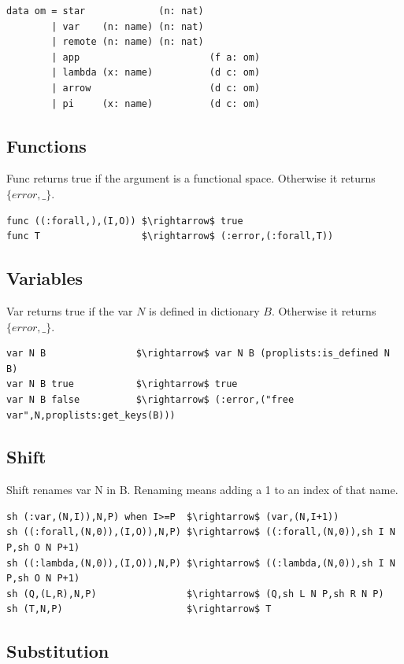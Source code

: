 \documentclass{aip-cp}
\begin{document}
\begin{lstlisting}[mathescape=true]
data om = star             (n: nat)
        | var    (n: name) (n: nat)
        | remote (n: name) (n: nat)
        | app                       (f a: om)
        | lambda (x: name)          (d c: om)
        | arrow                     (d c: om)
        | pi     (x: name)          (d c: om)
\end{lstlisting}

\subsection{Functions}
Func returns true if the argument is a functional space. Otherwise it returns $\{error,\_\}$.

\begin{lstlisting}[mathescape=true]
func ((:forall,),(I,O)) $\rightarrow$ true
func T                  $\rightarrow$ (:error,(:forall,T))
\end{lstlisting}

\subsection{Variables}
Var returns true if the var $N$ is defined in dictionary $B$. Otherwise it returns $\{error,\_\}$.

\begin{lstlisting}[mathescape=true]
var N B                $\rightarrow$ var N B (proplists:is_defined N B)
var N B true           $\rightarrow$ true
var N B false          $\rightarrow$ (:error,("free var",N,proplists:get_keys(B)))
\end{lstlisting}

\subsection{Shift}
Shift renames var N in B. Renaming means adding a 1 to an index of that name.

\begin{lstlisting}[mathescape=true]
sh (:var,(N,I)),N,P) when I>=P  $\rightarrow$ (var,(N,I+1))
sh ((:forall,(N,0)),(I,O)),N,P) $\rightarrow$ ((:forall,(N,0)),sh I N P,sh O N P+1)
sh ((:lambda,(N,0)),(I,O)),N,P) $\rightarrow$ ((:lambda,(N,0)),sh I N P,sh O N P+1)
sh (Q,(L,R),N,P)                $\rightarrow$ (Q,sh L N P,sh R N P)
sh (T,N,P)                      $\rightarrow$ T
\end{lstlisting}

\subsection{Substitution}
\end{document}
